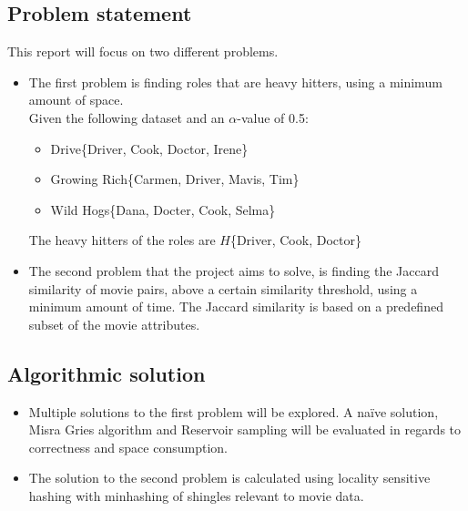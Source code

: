 \subsection{Problem statement}
	This report will focus on two different problems.
\begin{itemize}
	\item The first problem is finding roles that are heavy hitters, using a minimum amount of space. \\ %
	Given the following dataset and an \(\alpha\)-value of 0.5: 
	\begin{itemize}
		\item Drive\{Driver, Cook, Doctor, Irene\}
		\item Growing Rich\{Carmen, Driver, Mavis, Tim\}
		\item Wild Hogs\{Dana, Docter, Cook, Selma\}
	\end{itemize}
	The heavy hitters of the roles are \(H\)\{Driver, Cook, Doctor\}
	\item The second problem that the project aims to solve, is finding the Jaccard similarity of movie pairs, above a certain similarity threshold, using a minimum amount of time. The Jaccard similarity is based on a predefined subset of the movie attributes.
	
\end{itemize}

\subsection{Algorithmic solution}
\begin{itemize}
	\item Multiple solutions to the first problem will be explored. A naïve solution, Misra Gries algorithm and Reservoir sampling will be evaluated in regards to correctness and space consumption.
	\item The solution to the second problem is calculated using locality sensitive hashing with minhashing of shingles relevant to movie data.
\end{itemize}

